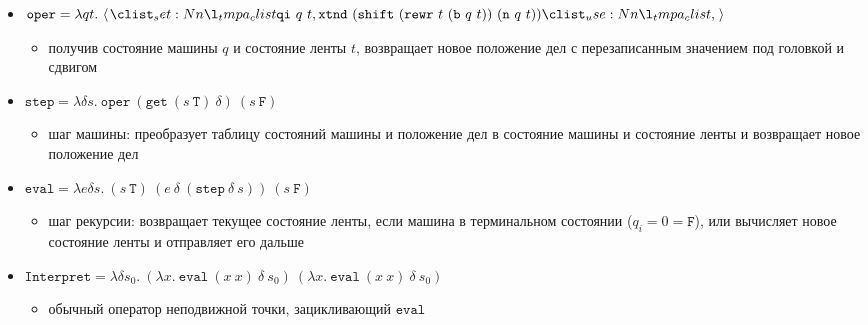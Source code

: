 \documentclass{article}
\newcommand{\T}{\mathtt{T}}
\newcommand{\F}{\mathtt{F}}
\begin{document}
\begin{itemize}
\begin{itemize}
  \end{itemize}
  \item $\mathtt{oper} = \lambda qt.\ \opair{\mathtt{qi}\ q\ t, \mathtt{xtnd}\ (\mathtt{shift}\ (\mathtt{rewr}\ t\ (\mathtt{b}\ q\ t))\ (\mathtt{n}\ q\ t)) } $
  \begin{itemize}
    \item получив состояние машины $q$ и состояние ленты $t$, возвращает новое положение дел с перезаписанным значением под головкой и сдвигом
  \end{itemize}
  \item $\mathtt{step} = \lambda \delta s.\ \mathtt{oper}\ (\mathtt{get}\ (s\ \T)\ \delta)\ (s\ \F)$
  \begin{itemize}
    \item шаг машины: преобразует таблицу состояний машины и положение дел в состояние машины и состояние ленты и возвращает новое положение дел
  \end{itemize}
  \item $\mathtt{eval} = \lambda e\delta s.\ (s\ \T)\ (e\ \delta\ (\mathtt{step}\ \delta\ s))\ (s\ \F)$ 
  \begin{itemize}
    \item шаг рекурсии: возвращает текущее состояние ленты, если машина в терминальном состоянии ($q_i = 0 = \F$), или вычисляет новое состояние ленты и отправляет его дальше
  \end{itemize}
  \item $\mathtt{Interpret} = \lambda \delta s_0.\  (\lambda x.\ \mathtt{eval}\ (x\ x)\ \delta\ s_0)\ (\lambda x.\ \mathtt{eval}\ (x\ x)\ \delta\ s_0)$
  \begin{itemize}
    \item обычный оператор неподвижной точки, зацикливающий $\mathtt{eval}$
  \end{itemize}
  
\end{itemize}
\end{document}
